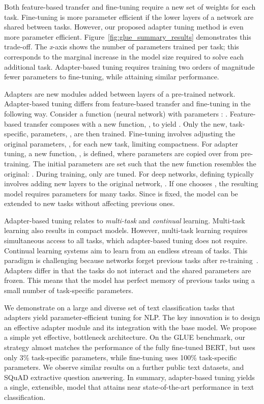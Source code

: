 \documentclass{article}
\begin{document}
Both feature-based transfer and fine-tuning require a new set of weights for each task.
Fine-tuning is more parameter efficient if the lower layers of a network are shared between tasks.
However, our proposed adapter tuning method is even more parameter efficient.
Figure~\ref{fig:glue_summary_results} demonstrates this trade-off.
The \emph{x}-axis shows the number of parameters trained per task;
this corresponds to the marginal increase in the model size required to solve each additional task.
Adapter-based tuning requires training two orders of magnitude fewer parameters to fine-tuning, while attaining similar performance.

Adapters are new modules added between layers of a pre-trained network.
Adapter-based tuning differs from feature-based transfer and fine-tuning in the following way.
Consider a function (neural network) with parameters : .
Feature-based transfer composes  with a new function, , to yield .
Only the new, task-specific, parameters, , are then trained.
Fine-tuning involves adjusting the original parameters, , for each new task, limiting compactness.
For adapter tuning, a new function, , is defined, where parameters  are copied over from pre-training.
The initial parameters  are set such that the new function resembles the original: .
During training, only  are tuned.
For deep networks, defining  typically involves adding new layers to the original network, .
If one chooses , the resulting model requires  parameters for many tasks.
Since  is fixed, the model can be extended to new tasks without affecting previous ones.

Adapter-based tuning relates to \emph{multi-task} and \emph{continual} learning.
Multi-task learning also results in compact models.
However, multi-task learning requires simultaneous access to all tasks, which adapter-based tuning does not require.
Continual learning systems aim to learn from an endless stream of tasks.
This paradigm is challenging because networks forget previous tasks after re-training~\citep{mccloskey1989catastrophic,french1999catastrophic}.
Adapters differ in that the tasks do not interact and the shared parameters are frozen.
This means that the model has perfect memory of previous tasks using a small number of task-specific parameters.

We demonstrate on a large and diverse set of text classification tasks that adapters yield parameter-efficient tuning for NLP.
The key innovation is to design an effective adapter module and its integration with the base model.
We propose a simple yet effective, bottleneck architecture.
On the GLUE benchmark, our strategy almost matches the performance of the fully fine-tuned BERT,
but uses only 3\% task-specific parameters, while fine-tuning uses 100\% task-specific parameters.
We observe similar results on a further  public text datasets, and SQuAD extractive question answering.
In summary, adapter-based tuning yields a single, extensible, model that attains near state-of-the-art performance in text classification.
\end{document}
